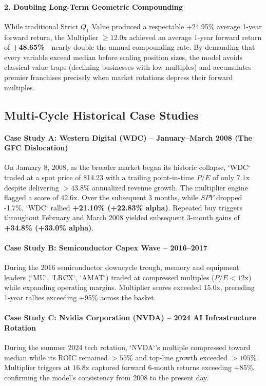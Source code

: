 \documentclass[11pt]{article}
\begin{document}
\paragraph{2. Doubling Long-Term Geometric Compounding}
While traditional Strict $Q_1$ Value produced a respectable +24.95\% average 1-year forward return, the Multiplier $\ge 12.0\text{x}$ achieved an average 1-year forward return of \textbf{+48.65\%}---nearly double the annual compounding rate. By demanding that every variable exceed median before scaling position sizes, the model avoids classical value traps (declining businesses with low multiples) and accumulates premier franchises precisely when market rotations depress their forward multiples.

\subsection{Multi-Cycle Historical Case Studies}

\paragraph{Case Study A: Western Digital (WDC) -- January--March 2008 (The GFC Dislocation)}
On January 8, 2008, as the broader market began its historic collapse, `WDC` traded at a spot price of \$14.23 with a trailing point-in-time $P/E$ of only $7.1\text{x}$ despite delivering $>43.8\%$ annualized revenue growth. The multiplier engine flagged a score of $42.6\text{x}$. Over the subsequent 3 months, while $SPY$ dropped -1.7\%, `WDC` rallied \textbf{+21.10\% (+22.83\% alpha)}. Repeated buy triggers throughout February and March 2008 yielded subsequent 3-month gains of \textbf{+34.8\% (+33.0\% alpha)}.

\paragraph{Case Study B: Semiconductor Capex Wave -- 2016--2017}
During the 2016 semiconductor downcycle trough, memory and equipment leaders (`MU`, `LRCX`, `AMAT`) traded at compressed multiples ($P/E < 12\text{x}$) while expanding operating margins. Multiplier scores exceeded $15.0\text{x}$, preceding 1-year rallies exceeding +95\% across the basket.

\paragraph{Case Study C: Nvidia Corporation (NVDA) -- 2024 AI Infrastructure Rotation}
During the summer 2024 tech rotation, `NVDA`'s multiple compressed toward median while its ROIC remained $>55\%$ and top-line growth exceeded $>105\%$. Multiplier triggers at $16.8\text{x}$ captured forward 6-month returns exceeding +85\%, confirming the model's consistency from 2008 to the present day.
\end{document}
